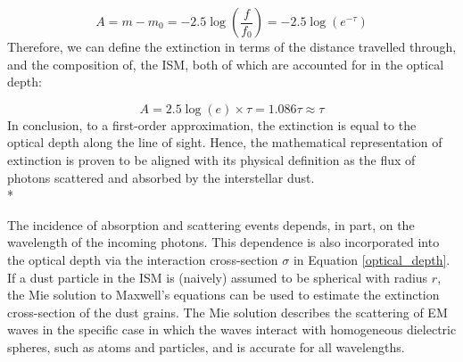 \documentclass[12pt, a4paper]{report}
\begin{document}
\begin{equation}
A = m - m_{0} = -2.5\log\left(\frac{f}{f_{0}}\right) = -2.5\log(e^{-\tau})
\label{ext_optical_depth_mags}
\end{equation}
Therefore, we can define the extinction in terms of the distance travelled through, and the composition of, the ISM, both of which are accounted for in the optical depth:

\begin{equation}
A = 2.5\log(e) \times \tau = 1.086\tau \approx \tau
\label{ext_optical_depth}
\end{equation}
In conclusion, to a first-order approximation, the extinction is equal to the optical depth along the line of sight. Hence, the mathematical representation of extinction is proven to be aligned with its physical definition as the flux of photons scattered and absorbed by the interstellar dust. \\*

The incidence of absorption and scattering events depends, in part, on the wavelength of the incoming photons. This dependence is also incorporated into the optical depth via the interaction cross-section $\sigma$ in Equation \ref{optical_depth}. If a dust particle in the ISM is (naively) assumed to be spherical with radius $r$, the Mie solution \citep{1908AnP...330..377M} to Maxwell's equations can be used to estimate the extinction cross-section of the dust grains. The Mie solution describes the scattering of EM waves in the specific case in which the waves interact with homogeneous dielectric spheres, such as atoms and particles, and is accurate for all wavelengths.


\end{document}
